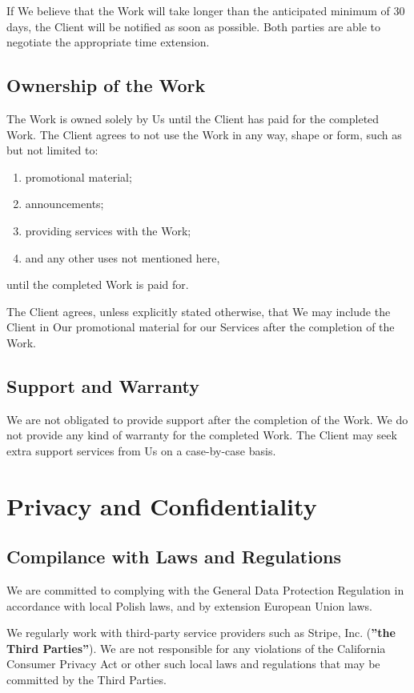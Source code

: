\documentclass{article}
\begin{document}
If We believe that the Work will take longer than the anticipated minimum of 30 days, the Client will be notified as soon as possible. Both parties are able to negotiate the appropriate time extension.

\subsection{Ownership of the Work}
The Work is owned solely by Us until the Client has paid for the completed Work. The Client agrees to not use the Work in any way, shape or form, such as but not limited to:
\begin{enumerate}
    \item promotional material;
    \item announcements;
    \item providing services with the Work;
    \item and any other uses not mentioned here,
\end{enumerate}
until the completed Work is paid for.

The Client agrees, unless explicitly stated otherwise, that We may include the Client in Our promotional material for our Services after the completion of the Work.

\subsection{Support and Warranty}
We are not obligated to provide support after the completion of the Work. We do not provide any kind of warranty for the completed Work. The Client may seek extra support services from Us on a case-by-case basis.

\section{Privacy and Confidentiality}
\subsection{Compilance with Laws and Regulations}
We are committed to complying with the General Data Protection Regulation in accordance with local Polish laws, and by extension European Union laws.

We regularly work with third-party service providers such as Stripe, Inc. (\textbf{''the Third Parties''}). We are not responsible for any violations of the California Consumer Privacy Act or other such local laws and regulations that may be committed by the Third Parties.
\end{document}
